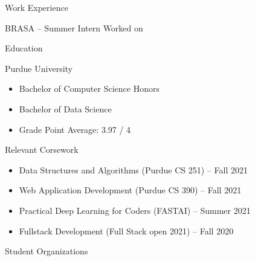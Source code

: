 \documentclass{article}
\newlength{\tabin}
\newlength{\secsep}
\newcommand{\lineunder}{\vspace*{-8pt} \\ \hspace*{-6pt} \hrulefill \\ \vspace*{-15pt}}
\newenvironment{tabbedsection}[1]{
  \begin{list}{}{
      \setlength{\itemsep}{0pt}
      \setlength{\labelsep}{0pt}
      \setlength{\labelwidth}{0pt}
      \setlength{\leftmargin}{\tabin}
      \setlength{\rightmargin}{\tabin}
      \setlength{\listparindent}{0pt}
      \setlength{\parsep}{0pt}
      \setlength{\parskip}{0pt}
      \setlength{\partopsep}{0pt}
      \setlength{\topsep}{#1}
    }
  \item[]
}{\end{list}}
\newenvironment{resume_section}[1]{
  \filbreak
  \vspace{2\secsep}
  \textsc{\large#1}
  \lineunder
  \begin{tabbedsection}{\secsep}
}{\end{tabbedsection}}
\newenvironment{resume_subsection}[2][]{
  \textbf{#2} \hfill {\footnotesize #1} \hspace{2em}
  \begin{tabbedsection}{0.5\secsep}
}{\end{tabbedsection}}
\newenvironment{subitems}{
  \renewcommand{\labelitemi}{-}
  \begin{itemize}
      \setlength{\labelsep}{1em}
}{\end{itemize}}
\begin{document}
\begin{resume_section}{Work Experience}

	\begin{resume_subsection}{BRASA -- Summer Intern}
		Worked on
	\end{resume_subsection}

\end{resume_section}

\begin{resume_section}{Education}
  
  \begin{resume_subsection}{Purdue University}
    
    \begin{subitems}
      \item Bachelor of Computer Science Honors
      \item Bachelor of Data Science
      \item Grade Point Average: 3.97 / 4
    \end{subitems}
  
  \end{resume_subsection}
  
  \begin{resume_subsection}[]{Relevant Corsework}
  	
	\begin{subitems}
		\item Data Structures and Algorithms (Purdue CS 251) -- Fall 2021
		\item Web Application Development (Purdue CS 390) -- Fall 2021
		\item Practical Deep Learning for Coders (FASTAI) -- Summer 2021
		\item Fullstack Development (Full Stack open 2021) -- Fall 2020
	\end{subitems}  	
  	
  \end{resume_subsection}
  
\end{resume_section}

\begin{resume_section}{Student Organizations}

\end{resume_section}
\end{document}
